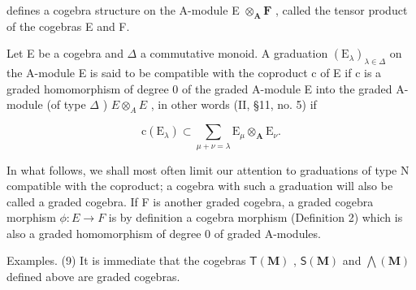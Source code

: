 defines a cogebra structure on the A-module E \(\otimes_{\mathbf{A}}\mathbf{F}\) , called the tensor product of the cogebras E and F.

Let E be a cogebra and \(\Delta\) a commutative monoid. A graduation \((\mathrm{E}_{\lambda})_{\lambda\in\Delta}\) on the A-module E is said to be compatible with the coproduct c of E if c is a graded homomorphism of degree 0 of the graded A-module E into the graded A-module (of type \(\Delta\) ) \(E\otimes_{A}E\) , in other words (II, §11, no. 5) if

\[
\mathrm{c} (\mathrm{E} _ {\lambda}) \subset \sum_ {\mu + \nu = \lambda} \mathrm{E} _ {\mu} \otimes_ {\mathbf {A}} \mathrm{E} _ {\nu}.\tag{10}
\]

In what follows, we shall most often limit our attention to graduations of type N compatible with the coproduct; a cogebra with such a graduation will also be called a graded cogebra. If F is another graded cogebra, a graded cogebra morphism \(\phi:E\to F\) is by definition a cogebra morphism (Definition 2) which is also a graded homomorphism of degree 0 of graded A-modules.

Examples. (9) It is immediate that the cogebras \(\mathsf{T}(\mathbf{M})\) , \(\mathsf{S}(\mathbf{M})\) and \(\bigwedge (\mathbf{M})\) defined above are graded cogebras.

